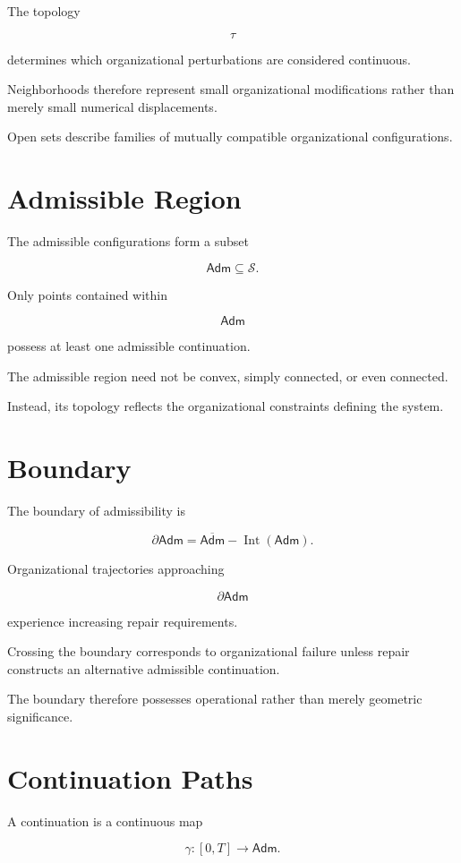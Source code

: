 \documentclass[11pt,oneside]{book}
\numberwithin{equation}{chapter}
\theoremstyle{definition}
\theoremstyle{plain}
\newcommand{\Adm}{\mathsf{Adm}}
\begin{document}
The topology

\[
\tau
\]

determines which organizational perturbations are considered continuous.

Neighborhoods therefore represent small organizational modifications
rather than merely small numerical displacements.

Open sets describe families of mutually compatible organizational
configurations.

\section{Admissible Region}

The admissible configurations form a subset

\[
\Adm
\subseteq
\mathcal S.
\]

Only points contained within

\[
\Adm
\]

possess at least one admissible continuation.

The admissible region need not be convex, simply connected, or even
connected.

Instead, its topology reflects the organizational constraints defining the
system.

\section{Boundary}

The boundary of admissibility is

\[
\partial
\Adm
=
\overline{\Adm}
-
\operatorname{Int}
(\Adm).
\]

Organizational trajectories approaching

\[
\partial
\Adm
\]

experience increasing repair requirements.

Crossing the boundary corresponds to organizational failure unless repair
constructs an alternative admissible continuation.

The boundary therefore possesses operational rather than merely geometric
significance.

\section{Continuation Paths}

A continuation is a continuous map

\[
\gamma
:
[0,T]
\rightarrow
\Adm.
\]
\end{document}
